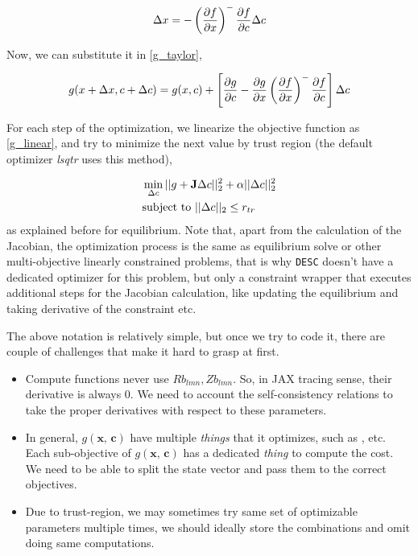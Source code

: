 \begin{equation}
    \Delta x = - \left( \frac{\partial f}{\partial x} \right) ^{-} \frac{\partial f}{\partial c} \Delta c
\end{equation}

Now, we can substitute it in \ref{g_taylor},

\begin{equation}
    g(x + \Delta x,c + \Delta c) = g(x, c) + \left[ \frac{\partial g}{\partial c} - \frac{\partial g}{\partial x} \left( \frac{\partial f}{\partial x} \right) ^{-} \frac{\partial f}{\partial c} \right] \Delta c \label{g_linear}
\end{equation}

For each step of the optimization, we linearize the objective function as \ref{g_linear}, and try to minimize the next value by trust region (the default optimizer \textit{lsqtr} uses this method), 

\begin{align*}
    &\min_{\Delta c} ||g  + \mathbf{J} \Delta c||^2_2 + \alpha||\Delta c||_2^2  \\
    &\text{subject to } ||\Delta c||_2 \leq r_{tr}
\end{align*}
as explained before for equilibrium. Note that, apart from the calculation of the Jacobian, the optimization process is the same as equilibrium solve or other multi-objective linearly constrained problems, that is why \texttt{DESC} doesn't have a dedicated optimizer for this problem, but only a constraint wrapper that executes additional steps for the Jacobian calculation, like updating the equilibrium and taking derivative of the  constraint etc.


The above notation is relatively simple, but once we try to code it, there are couple of challenges that make it hard to grasp at first.
\begin{itemize}
    \item Compute functions never use $Rb_{lmn}, Zb_{lmn}$. So, in JAX tracing sense, their derivative is always 0. We need to account the self-consistency relations to take the proper derivatives with respect to these parameters.
    \item In general, $g(\textbf{x, c})$ have multiple \textit{things} that it optimizes, such as ,  etc. Each sub-objective of $g(\textbf{x, c})$ has a dedicated \textit{thing} to compute the cost. We need to be able to split the state vector and pass them to the correct objectives.
    \item Due to trust-region, we may sometimes try same set of optimizable parameters multiple times, we should ideally store the combinations and omit doing same computations.
\end{itemize}

